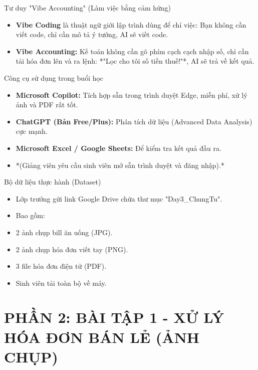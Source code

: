 \documentclass[aspectratio=169]{beamer}
\begin{document}
\begin{frame}{Tư duy "Vibe Accounting" (Làm việc bằng cảm hứng)}
    \begin{itemize}
        \item \textbf{Vibe Coding} là thuật ngữ giới lập trình dùng để chỉ việc: Bạn không cần viết code, chỉ cần mô tả ý tưởng, AI sẽ viết code.
        \item \textbf{Vibe Accounting:} Kế toán không cần gõ phím cạch cạch nhập số, chỉ cần tải hóa đơn lên và ra lệnh: *"Lọc cho tôi số tiền thuế!"*, AI sẽ trả về kết quả.
    \end{itemize}
\end{frame}


\begin{frame}{Công cụ sử dụng trong buổi học}
    \begin{itemize}
        \item \textbf{Microsoft Copilot:} Tích hợp sẵn trong trình duyệt Edge, miễn phí, xử lý ảnh và PDF rất tốt.
        \item \textbf{ChatGPT (Bản Free/Plus):} Phân tích dữ liệu (Advanced Data Analysis) cực mạnh.
        \item \textbf{Microsoft Excel / Google Sheets:} Để kiểm tra kết quả đầu ra.
        \item *(Giảng viên yêu cầu sinh viên mở sẵn trình duyệt và đăng nhập).*
    \end{itemize}
\end{frame}


\begin{frame}{Bộ dữ liệu thực hành (Dataset)}
    \begin{itemize}
        \item Lớp trưởng gửi link Google Drive chứa thư mục "Day3\_ChungTu".
        \item Bao gồm:
        \item 2 ảnh chụp bill ăn uống (JPG).
        \item 2 ảnh chụp hóa đơn viết tay (PNG).
        \item 3 file hóa đơn điện tử (PDF).
        \item Sinh viên tải toàn bộ về máy.
    \end{itemize}
\end{frame}


\section{PHẦN 2: BÀI TẬP 1 - XỬ LÝ HÓA ĐƠN BÁN LẺ (ẢNH CHỤP)}
\end{document}
